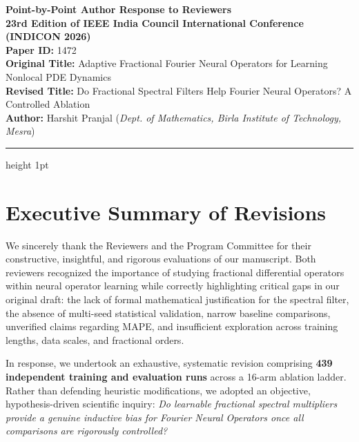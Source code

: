 \documentclass[11pt,a4paper]{article}
\begin{document}
\begin{center}
  {\LARGE \textbf{\color{navyblue}Point-by-Point Author Response to Reviewers}}\\[3mm]
  {\large \textbf{23rd Edition of IEEE India Council International Conference (INDICON 2026)}}\\[2mm]
  \textbf{Paper ID:} 1472 \\[1mm]
  \textbf{Original Title:} Adaptive Fractional Fourier Neural Operators for Learning Nonlocal PDE Dynamics \\[1mm]
  \textbf{Revised Title:} Do Fractional Spectral Filters Help Fourier Neural Operators? A Controlled Ablation \\[1mm]
  \textbf{Author:} Harshit Pranjal (\textit{Dept. of Mathematics, Birla Institute of Technology, Mesra})
\end{center}

\vspace{3mm}
\hrule height 1pt
\vspace{4mm}

\section*{Executive Summary of Revisions}

We sincerely thank the Reviewers and the Program Committee for their constructive, insightful, and rigorous evaluations of our manuscript. Both reviewers recognized the importance of studying fractional differential operators within neural operator learning while correctly highlighting critical gaps in our original draft: the lack of formal mathematical justification for the spectral filter, the absence of multi-seed statistical validation, narrow baseline comparisons, unverified claims regarding MAPE, and insufficient exploration across training lengths, data scales, and fractional orders.

In response, we undertook an exhaustive, systematic revision comprising \textbf{439 independent training and evaluation runs} across a 16-arm ablation ladder. Rather than defending heuristic modifications, we adopted an objective, hypothesis-driven scientific inquiry: \textit{Do learnable fractional spectral multipliers provide a genuine inductive bias for Fourier Neural Operators once all comparisons are rigorously controlled?} 
\end{document}
